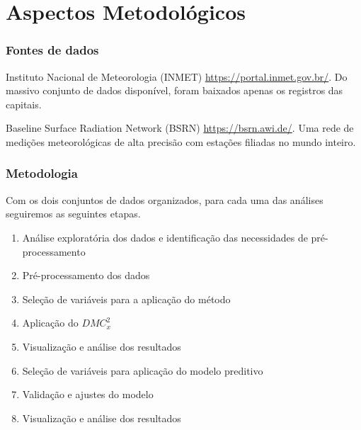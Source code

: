\documentclass[10pt]{beamer}
\newcommand{\dmc}{\(DMC_x^2\) }
\begin{document}
\section{Aspectos Metodológicos}

\begin{frame}
  \frametitle{Fontes de dados}

Instituto Nacional de Meteorologia (INMET) \url{https://portal.inmet.gov.br/}. Do massivo conjunto de dados disponível, foram baixados apenas os registros das capitais.

Baseline Surface Radiation Network (BSRN) \url{https://bsrn.awi.de/}. Uma rede de medições meteorológicas de alta precisão com estações filiadas no mundo inteiro. 

\end{frame}

\begin{frame}
  \frametitle{Metodologia}

  Com os dois conjuntos de dados organizados, para cada uma das análises seguiremos as seguintes etapas.

\begin{enumerate}
    \item Análise exploratória dos dados e identificação das necessidades de pré-processamento
    \item Pré-processamento dos dados
    \item Seleção de variáveis para a aplicação do método
    \item Aplicação do \dmc
    \item Visualização e análise dos resultados
    \item Seleção de variáveis para aplicação do modelo preditivo
    \item Validação e ajustes do modelo
    \item Visualização e análise dos resultados
\end{enumerate}

  
\end{frame}
\end{document}
